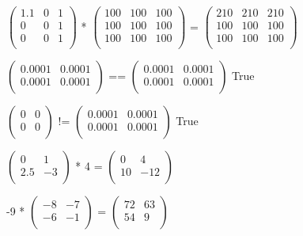 \documentclass{article}
\begin{document}
$\begin{pmatrix}
1.1 & 0 & 1\\
0 & 0 & 1\\
0 & 0 & 1\\
\end{pmatrix}$
*
$\begin{pmatrix}
100 & 100 & 100\\
100 & 100 & 100\\
100 & 100 & 100\\
\end{pmatrix}$
=
$\begin{pmatrix}
210 & 210 & 210\\
100 & 100 & 100\\
100 & 100 & 100\\
\end{pmatrix}$

$\begin{pmatrix}
0.0001 & 0.0001\\
0.0001 & 0.0001\\
\end{pmatrix}$
==
$\begin{pmatrix}
0.0001 & 0.0001\\
0.0001 & 0.0001\\
\end{pmatrix}$
True

$\begin{pmatrix}
0 & 0\\
0 & 0\\
\end{pmatrix}$
!=
$\begin{pmatrix}
0.0001 & 0.0001\\
0.0001 & 0.0001\\
\end{pmatrix}$
True

$\begin{pmatrix}
0 & 1\\
2.5 & -3\\
\end{pmatrix}$
*
4
=
$\begin{pmatrix}
0 & 4\\
10 & -12\\
\end{pmatrix}$

-9 * 
$\begin{pmatrix}
-8 & -7\\
-6 & -1\\
\end{pmatrix}$
=
$\begin{pmatrix}
72 & 63\\
54 & 9\\
\end{pmatrix}$
\end{document}
